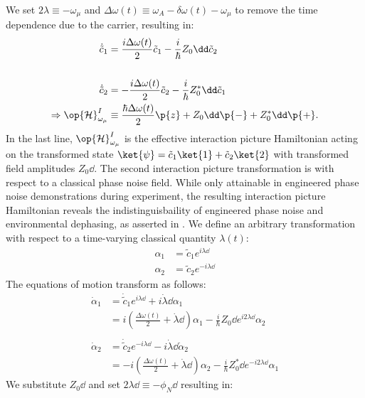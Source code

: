 We set $2\lambda \equiv -\omega_\mu$ and $\Delta \omega(t) \equiv \omega_A - \delta\omega(t) -\omega_\mu$ to remove the time dependence due to the carrier, resulting in:
\begin{align}
\dot{\tilde{c}}_1 & =  \frac{i\Delta \omega(t)}{2}\tilde{c}_1 - \frac{i}{\hbar}Z_0\dd \tilde{c}_2\\
& \nonumber \\
\dot{\tilde{c}}_2 & =  -\frac{i\Delta \omega(t) }{2}\tilde{c}_2- \frac{i}{\hbar}Z_0^*\dd \tilde{c}_1\\
 \Rightarrow \op{\mathcal{H}}_{\omega_\mu}^{I} &\equiv \frac{\hbar \Delta \omega(t)}{2}\p{z} + Z_0\dd\p{-} + Z_0^*\dd\p{+}.
\end{align}
In the last line, $\op{\mathcal{H}}_{\omega_\mu}^{I}$ is the effective interaction picture Hamiltonian acting on the transformed state $\ket{\psi} = \tilde{c}_1\ket{1} + \tilde{c}_2\ket{2}$ with transformed field amplitudes $Z_0\dd$.
The second interaction picture transformation is with respect to a classical phase noise field. While only attainable in engineered phase noise demonstrations during experiment, the resulting interaction picture Hamiltonian reveals the indistinguisbaility of engineered phase noise and environmental dephasing, as asserted in \cite{soare2014}. We define an arbitrary transformation with respect to a time-varying classical quantity $\lambda (t)$:
\begin{align}
\alpha_1 &= \tilde{c}_1e^{i\lambda\dd} \\
\alpha_2 &= \tilde{c}_2e^{-i\lambda\dd}
\end{align}
The equations of motion transform as follows:
\begin{align}
\dot{\alpha}_1 & = \dot{\tilde{c}}_1 e^{i \lambda\dd} + i \dot{\lambda}\dd \alpha_1 \nonumber \\
& =  i(\frac{\Delta \omega(t)}{2} + \dot{\lambda}\dd)\alpha_1 - \frac{i}{\hbar}Z_0\dd e^{i2\lambda\dd}\alpha_2 \\
& \nonumber \\
\dot{\alpha}_2 & = \dot{\tilde{c}}_2 e^{-i \lambda\dd} - i \dot{\lambda}\dd\dot{\alpha}_2 \nonumber \\
& =  -i(\frac{\Delta \omega(t)}{2} + \dot{\lambda}\dd)\alpha_2- \frac{i}{\hbar}Z_0^*\dd e^{-i2\lambda\dd}\alpha_1
\end{align}
We substitute $Z_0\dd$ and set $2\lambda\dd \equiv -\phi_N\dd$ resulting in:

